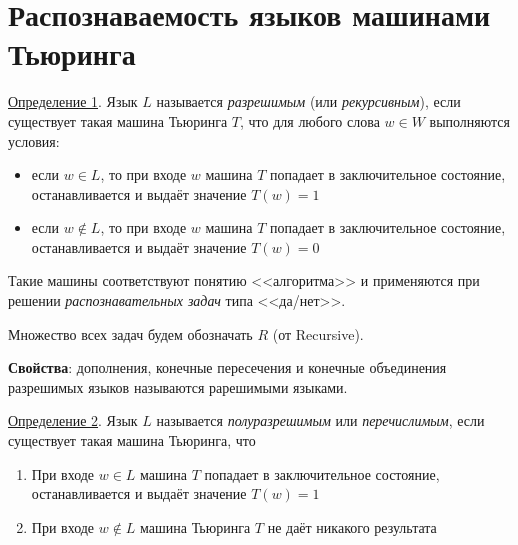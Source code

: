 \section{Распознаваемость языков машинами Тьюринга}
\underline{Определение 1}. Язык $L$ называется \textit{разрешимым} (или \textit{рекурсивным}), если существует такая машина Тьюринга $T$, что для любого слова $w \in W$ выполняются условия:
\begin{itemize}
    \item если $w \in L$, то при входе $w$ машина $T$ попадает в заключительное состояние, останавливается и выдаёт значение $T(w) = 1$
    \item если $w \not \in L$, то при входе $w$ машина $T$ попадает в заключительное состояние, останавливается и выдаёт значение $T(w) = 0$
\end{itemize}

Такие машины соответствуют понятию <<алгоритма>> и применяются при решении \textit{распознавательных задач} типа <<да/нет>>.

Множество всех задач будем обозначать $R$ (от Recursive).

\textbf{Свойства}: дополнения, конечные пересечения и конечные объединения разрешимых языков называются рарешимыми языками.

\underline{Определение 2}. Язык $L$ называется \textit{полуразрешимым} или \textit{перечислимым}, если существует такая машина Тьюринга, что

\begin{enumerate}
    \item При входе $w \in L$ машина $T$ попадает в заключительное состояние, останавливается и выдаёт значение $T(w) = 1$
    \item При входе $w \not\in L$ машина Тьюринга $T$ не даёт никакого результата
\end{enumerate}
